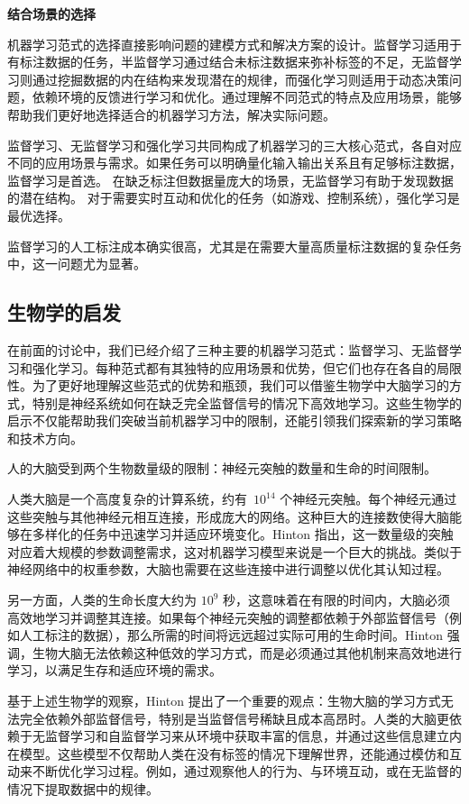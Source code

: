 {\bf 结合场景的选择}


机器学习范式的选择直接影响问题的建模方式和解决方案的设计。监督学习适用于有标注数据的任务，半监督学习通过结合未标注数据来弥补标签的不足，无监督学习则通过挖掘数据的内在结构来发现潜在的规律，而强化学习则适用于动态决策问题，依赖环境的反馈进行学习和优化。通过理解不同范式的特点及应用场景，能够帮助我们更好地选择适合的机器学习方法，解决实际问题。


监督学习、无监督学习和强化学习共同构成了机器学习的三大核心范式，各自对应不同的应用场景与需求。如果任务可以明确量化输入输出关系且有足够标注数据，监督学习是首选。
在缺乏标注但数据量庞大的场景，无监督学习有助于发现数据的潜在结构。
对于需要实时互动和优化的任务（如游戏、控制系统），强化学习是最优选择。


监督学习的人工标注成本确实很高，尤其是在需要大量高质量标注数据的复杂任务中，这一问题尤为显著。

\subsection{生物学的启发}

在前面的讨论中，我们已经介绍了三种主要的机器学习范式：监督学习、无监督学习和强化学习。每种范式都有其独特的应用场景和优势，但它们也存在各自的局限性。为了更好地理解这些范式的优势和瓶颈，我们可以借鉴生物学中大脑学习的方式，特别是神经系统如何在缺乏完全监督信号的情况下高效地学习。这些生物学的启示不仅能帮助我们突破当前机器学习中的限制，还能引领我们探索新的学习策略和技术方向。

人的大脑受到两个生物数量级的限制：神经元突触的数量和生命的时间限制。

人类大脑是一个高度复杂的计算系统，约有~${10}^{14}$  个神经元突触。每个神经元通过这些突触与其他神经元相互连接，形成庞大的网络。这种巨大的连接数使得大脑能够在多样化的任务中迅速学习并适应环境变化。Hinton 指出，这一数量级的突触对应着大规模的参数调整需求，这对机器学习模型来说是一个巨大的挑战。类似于神经网络中的权重参数，大脑也需要在这些连接中进行调整以优化其认知过程。

另一方面，人类的生命长度大约为 ${10}^9$ 秒，这意味着在有限的时间内，大脑必须高效地学习并调整其连接。如果每个神经元突触的调整都依赖于外部监督信号（例如人工标注的数据），那么所需的时间将远远超过实际可用的生命时间。Hinton 强调，生物大脑无法依赖这种低效的学习方式，而是必须通过其他机制来高效地进行学习，以满足生存和适应环境的需求。

基于上述生物学的观察，Hinton 提出了一个重要的观点：生物大脑的学习方式无法完全依赖外部监督信号，特别是当监督信号稀缺且成本高昂时。人类的大脑更依赖于无监督学习和自监督学习来从环境中获取丰富的信息，并通过这些信息建立内在模型。这些模型不仅帮助人类在没有标签的情况下理解世界，还能通过模仿和互动来不断优化学习过程。例如，通过观察他人的行为、与环境互动，或在无监督的情况下提取数据中的规律。

